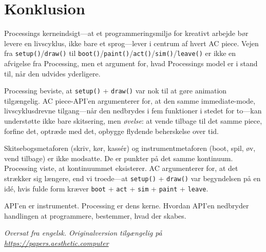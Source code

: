 \documentclass[10pt,letterpaper,twocolumn]{article}
\begin{document}

\section{Konklusion}
\label{sec:conclusion}

Processings kerneindsigt---at et programmeringsmiljø for kreativt arbejde bør levere en livscyklus, ikke bare et sprog---lever i centrum af hvert AC piece. Vejen fra \texttt{setup()}/\texttt{draw()} til \texttt{boot()}/\texttt{paint()}/\texttt{act()}/\texttt{sim()}/\texttt{leave()} er ikke en afvigelse fra Processing, men et argument for, hvad Processings model er i stand til, når den udvides yderligere.

Processing beviste, at \texttt{setup()} + \texttt{draw()} var nok til at gøre animation tilgængelig. AC piece-API'en argumenterer for, at den samme immediate-mode, livscyklusdrevne tilgang---når den nedbrydes i fem funktioner i stedet for to---kan understøtte ikke bare skitsering, men \emph{øvelse}: at vende tilbage til det samme piece, forfine det, optræde med det, opbygge flydende beherskelse over tid.

Skitsebogsmetaforen (skriv, kør, kassér) og instrumentmetaforen (boot, spil, øv, vend tilbage) er ikke modsatte. De er punkter på det samme kontinuum. Processing viste, at kontinuummet eksisterer. AC argumenterer for, at det strækker sig længere, end vi troede---at \texttt{setup()} + \texttt{draw()} var begyndelsen på en idé, hvis fulde form kræver \texttt{boot} + \texttt{act} + \texttt{sim} + \texttt{paint} + \texttt{leave}.

API'en er instrumentet. Processing er dens kerne. Hvordan API'en nedbryder handlingen at programmere, bestemmer, hvad der skabes.

\vspace{0.5em}\noindent\textit{Oversat fra engelsk. Originalversion tilgængelig på \url{https://papers.aesthetic.computer}}



\end{document}
